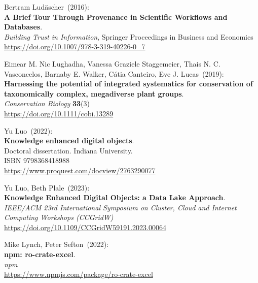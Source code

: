 \begin{thebibliography}{9}
Bertram Ludäscher~(2016): \\
\textbf{A Brief Tour Through Provenance in Scientific Workflows and Databases}.\\
\emph{Building Trust in Information}, Springer Proceedings in Business and Economics \\
\url{https://doi.org/10.1007/978-3-319-40226-0_7}

Eimear M. Nic Lughadha, Vanessa Graziele Staggemeier, Thais N. C. Vasconcelos, Barnaby E. Walker, Cátia Canteiro, Eve J. Lucas~(2019): \\
\textbf{Harnessing the potential of integrated systematics for conservation of taxonomically complex, megadiverse plant groups}.\\ 
\emph{Conservation Biology} \textbf{33}(3)\\
\url{https://doi.org/10.1111/cobi.13289}

Yu Luo~(2022): \\
\textbf{Knowledge enhanced digital objects}.\\
Doctoral dissertation. Indiana University.\\
ISBN 9798368418988 \\
\url{https://www.proquest.com/docview/2763290077}

Yu Luo, Beth Plale~(2023): \\
\textbf{Knowledge Enhanced Digital Objects: a Data Lake Approach}.\\
\emph{IEEE/ACM 23rd International Symposium on Cluster, Cloud and Internet Computing Workshops (CCGridW)}\\
\url{https://doi.org/10.1109/CCGridW59191.2023.00064}

Mike Lynch, Peter Sefton~(2022): \\
\textbf{npm: ro-crate-excel}.\\
\emph{npm} \\
\url{https://www.npmjs.com/package/ro-crate-excel}



\end{thebibliography}
